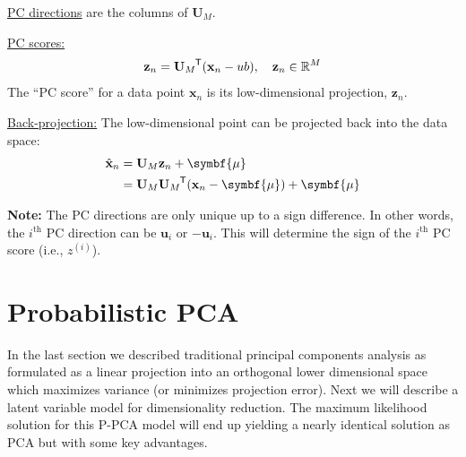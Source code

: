 \documentclass[11pt]{article}
\newcounter{descriptcount}
\newcommand{\xb}{\mathbf{x}}
\newcommand{\zb}{\mathbf{z}}
\newcommand{\ub}{\symbf{\mu}}
\newcommand*{\tran}{^{\mkern-1.5mu\mathsf{T}}}
\newenvironment{propertybox}{%
   \def\FrameCommand{\colorbox{LightSteelBlue}}%
   \MakeFramed{\advance\hsize-\width \FrameRestore}}
 {\endMakeFramed}
\begin{document}
\begin{framed}
\begin{description}[%
  before={\setcounter{descriptcount}{0}},%
  ,font=\bfseries\stepcounter{descriptcount}\thedescriptcount.~]
  \item{\underline{PC directions}} are the columns of $\mathbf{U}_M$.

  \item{\underline{PC scores:}}
    \begin{equation*}
      \zb_n = {\mathbf{U}_M} \tran (\xb_n - ub), \quad \zb_n \in \mathbb{R}^M
    \end{equation*}
    The ``PC score'' for a data point $\xb_n$ is its low-dimensional projection,
    $\zb_n$.

  \item{\underline{Back-projection:}}
    The low-dimensional point can be projected back into the data space:
    \begin{align*}
      \hat{\xb}_n &= \mathbf{U}_M \zb_n + \ub \\
        &= \mathbf{U}_M {\mathbf{U}_M}\tran (\xb_n - \ub) + \ub
    \end{align*}
\end{description}
\end{framed}

\begin{propertybox}
  \textbf{Note:} The PC directions are only unique up to a sign difference. In
  other words, the $i^{\text{th}}$ PC direction can be $\mathbf{u}_i$ or
  $-\mathbf{u}_i$. This will determine the sign of the $i^{\text{th}}$ PC
  score (i.e., $z^{(i)}$).
\end{propertybox}

\section{Probabilistic PCA}
In the last section we described traditional principal components analysis as
formulated as a linear projection into an orthogonal lower dimensional space
which maximizes variance (or minimizes projection error). Next we will describe
a latent variable model for dimensionality reduction. The maximum likelihood
solution for this P-PCA model will end up yielding a nearly identical solution
as PCA but with some key advantages.
\end{document}
